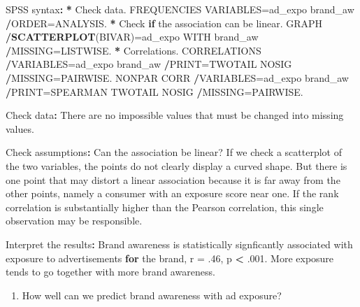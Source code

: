 \documentclass[a4paper]{book}
\newenvironment{Shaded}{\begin{snugshade}}{\end{snugshade}}
\newcommand{\KeywordTok}[1]{\textcolor[rgb]{0,0,0}{\textbf{#1}}}
\newcommand{\DecValTok}[1]{\textcolor[rgb]{0.00,0.00,0.00}{#1}}
\newcommand{\StringTok}[1]{\textcolor[rgb]{0.00,0.00,0.00}{#1}}
\newcommand{\ControlFlowTok}[1]{\textcolor[rgb]{0.00,0.00,0.00}{\textbf{#1}}}
\newcommand{\OperatorTok}[1]{\textcolor[rgb]{0.00,0.00,0.00}{\textbf{#1}}}
\newcommand{\ErrorTok}[1]{\textcolor[rgb]{0.00,0.00,0.00}{\textbf{#1}}}
\newcommand{\NormalTok}[1]{#1}
\providecommand{\tightlist}{%
  \setlength{\itemsep}{0pt}\setlength{\parskip}{0pt}}
\theoremstyle{definition}
\theoremstyle{definition}
\theoremstyle{definition}
\theoremstyle{remark}
\begin{document}
\begin{Shaded}
\begin{Highlighting}[]
\NormalTok{SPSS syntax}\OperatorTok{:}\StringTok{  }
\StringTok{  }
\ErrorTok{*}\StringTok{ }\NormalTok{Check data.  }
\NormalTok{FREQUENCIES VARIABLES=ad_expo brand_aw  }
  \OperatorTok{/}\NormalTok{ORDER=ANALYSIS.  }
\OperatorTok{*}\StringTok{ }\NormalTok{Check }\ControlFlowTok{if}\NormalTok{ the association can be linear.  }
\NormalTok{GRAPH  }
  \OperatorTok{/}\KeywordTok{SCATTERPLOT}\NormalTok{(BIVAR)=ad_expo WITH brand_aw  }
  \OperatorTok{/}\NormalTok{MISSING=LISTWISE.  }
\OperatorTok{*}\StringTok{ }\NormalTok{Correlations.  }
\NormalTok{CORRELATIONS  }
  \OperatorTok{/}\NormalTok{VARIABLES=ad_expo brand_aw  }
  \OperatorTok{/}\NormalTok{PRINT=TWOTAIL NOSIG  }
  \OperatorTok{/}\NormalTok{MISSING=PAIRWISE.  }
\NormalTok{NONPAR CORR  }
  \OperatorTok{/}\NormalTok{VARIABLES=ad_expo brand_aw  }
  \OperatorTok{/}\NormalTok{PRINT=SPEARMAN TWOTAIL NOSIG  }
  \OperatorTok{/}\NormalTok{MISSING=PAIRWISE.  }
  
\NormalTok{Check data}\OperatorTok{:}\StringTok{  }
\StringTok{  }
\NormalTok{There are no impossible values that must be changed  }
\NormalTok{into missing values.  }
  
\NormalTok{Check assumptions}\OperatorTok{:}\StringTok{  }
\StringTok{  }
\NormalTok{Can the association be linear? If we check a scatterplot  }
\NormalTok{of the two variables, the points do not clearly display  }
\NormalTok{a curved shape. But there is one point that may distort  }
\NormalTok{a linear association because it is far away from the   }
\NormalTok{other points, namely a consumer with an exposure score  }
\NormalTok{near one. If the rank correlation is substantially  }
\NormalTok{higher than the Pearson correlation, this single  }
\NormalTok{observation may be responsible.  }
  
\NormalTok{Interpret the results}\OperatorTok{:}\StringTok{  }
\StringTok{  }
\NormalTok{Brand awareness is statistically signficantly associated  }
\NormalTok{with exposure to advertisements }\ControlFlowTok{for}\NormalTok{ the brand, r =}\StringTok{ }\NormalTok{.}\DecValTok{46}\NormalTok{,  }
\NormalTok{p }\OperatorTok{<}\StringTok{ }\NormalTok{.}\DecValTok{001}\NormalTok{. More exposure tends to go together with more  }
\NormalTok{brand awareness.  }
\end{Highlighting}
\end{Shaded}

\begin{enumerate}
\def\labelenumi{\arabic{enumi}.}
\setcounter{enumi}{1}
\tightlist
\item
  How well can we predict brand awareness with ad exposure?
\end{enumerate}
\end{document}
